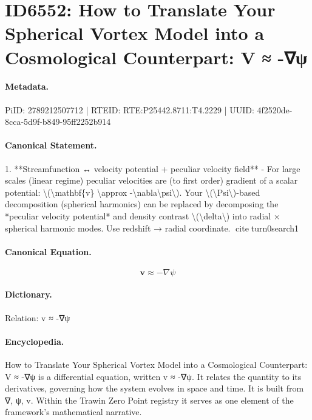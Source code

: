 \section*{ID6552: How to Translate Your Spherical Vortex Model into a Cosmological Counterpart: V ≈ -∇ψ}
\paragraph{Metadata.}
PiID: 2789212507712 | RTEID: RTE:P25442.8711:T4.2229 | UUID: 4f2520de-8cca-5d9f-b849-95ff2252b914

\paragraph{Canonical Statement.}
1. **Streamfunction ↔ velocity potential + peculiar velocity field** - For large scales (linear regime) peculiar velocities are (to first order) gradient of a scalar potential: \textbackslash{}(\textbackslash{}mathbf\{v\} \textbackslash{}approx -\textbackslash{}nabla\textbackslash{}psi\textbackslash{}). Your \textbackslash{}(\textbackslash{}Psi\textbackslash{})-based decomposition (spherical harmonics) can be replaced by decomposing the *peculiar velocity potential* and density contrast \textbackslash{}(\textbackslash{}delta\textbackslash{}) into radial × spherical harmonic modes. Use redshift → radial coordinate. citeturn0search1

\paragraph{Canonical Equation.}
\[
\mathbf{v} \approx -\nabla\psi
\]

\paragraph{Dictionary.}
Relation: v ≈ -∇ψ

\paragraph{Encyclopedia.}
How to Translate Your Spherical Vortex Model into a Cosmological Counterpart: V ≈ -∇ψ is a differential equation, written v ≈ -∇ψ. It relates the quantity to its derivatives, governing how the system evolves in space and time. It is built from ∇, ψ, v. Within the Trawin Zero Point registry it serves as one element of the framework's mathematical narrative.
